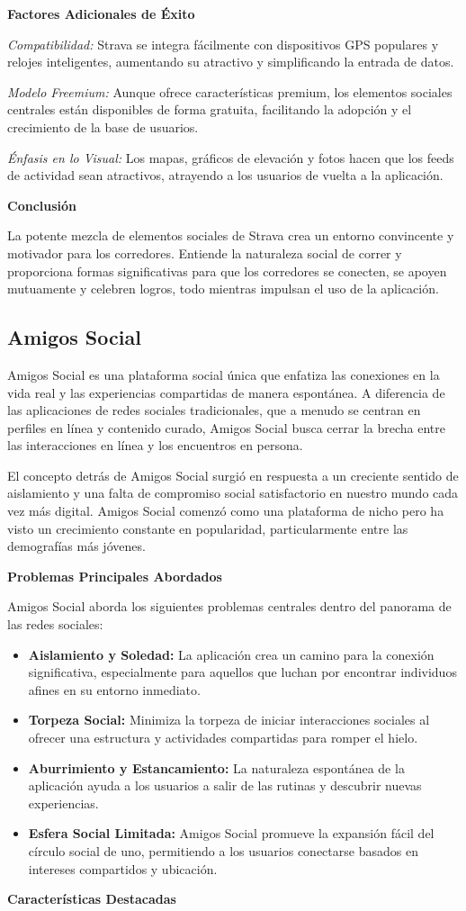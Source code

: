 \textbf{Factores Adicionales de Éxito}

\textit{Compatibilidad:} Strava se integra fácilmente con dispositivos GPS populares y relojes inteligentes, aumentando su atractivo 
y simplificando la entrada de datos.

\textit{Modelo Freemium:} Aunque ofrece características premium, los elementos sociales centrales están disponibles de forma 
gratuita, facilitando la adopción y el crecimiento de la base de usuarios.

\textit{Énfasis en lo Visual:} Los mapas, gráficos de elevación y fotos hacen que los feeds de actividad sean atractivos, 
atrayendo a los usuarios de vuelta a la aplicación.

\textbf{Conclusión}

La potente mezcla de elementos sociales de Strava crea un entorno convincente y motivador para los corredores. Entiende la 
naturaleza social de correr y proporciona formas significativas para que los corredores se conecten, se apoyen mutuamente y celebren logros, todo mientras impulsan el uso de la aplicación.


\subsection{Amigos Social}
Amigos Social es una plataforma social única que enfatiza las conexiones en la vida real y las experiencias compartidas de 
manera espontánea. A diferencia de las aplicaciones de redes sociales tradicionales, que a menudo se centran en perfiles en línea y contenido curado, 
Amigos Social busca cerrar la brecha entre las interacciones en línea y los encuentros en persona.

El concepto detrás de Amigos Social surgió en respuesta a un creciente sentido de aislamiento y una falta de compromiso social 
satisfactorio en nuestro mundo cada vez más digital. Amigos Social comenzó como una plataforma de nicho pero ha visto un crecimiento constante en popularidad, particularmente entre las demografías más jóvenes.


\textbf{Problemas Principales Abordados}

Amigos Social aborda los siguientes problemas centrales dentro del panorama de las redes sociales:
\begin{itemize}
\item \textbf{Aislamiento y Soledad:} La aplicación crea un camino para la conexión significativa, especialmente para aquellos que luchan por encontrar individuos afines en su entorno inmediato.
\item \textbf{Torpeza Social:} Minimiza la torpeza de iniciar interacciones sociales al ofrecer una estructura y actividades compartidas para romper el hielo.
\item \textbf{Aburrimiento y Estancamiento:} La naturaleza espontánea de la aplicación ayuda a los usuarios a salir de las rutinas y descubrir nuevas experiencias.
\item \textbf{Esfera Social Limitada:} Amigos Social promueve la expansión fácil del círculo social de uno, permitiendo a los usuarios conectarse basados en intereses compartidos y ubicación.
\end{itemize}
\textbf{Características Destacadas}

